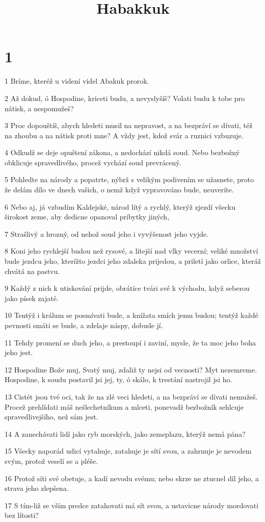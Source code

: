 

\title{Habakkuk}

\chapter{1}

\par 1 Bríme, kteréž u videní videl Abakuk prorok.
\par 2 Až dokud, ó Hospodine, kriceti budu, a nevyslyšíš? Volati budu k tobe pro nátisk, a nespomužeš?
\par 3 Proc dopouštíš, abych hledeti musil na nepravost, a na bezpráví se dívati, též na zhoubu a na nátisk proti mne? A vždy jest, kdož svár a ruznici vzbuzuje.
\par 4 Odkudž se deje opuštení zákona, a nedochází nikdá soud. Nebo bezbožný obklicuje spravedlivého, procež vychází soud prevrácený.
\par 5 Pohledte na národy a popatrte, nýbrž s velikým podivením se užasnete, proto že delám dílo ve dnech vašich, o nemž když vypravováno bude, neuveríte.
\par 6 Nebo aj, já vzbudím Kaldejské, národ lítý a rychlý, kterýž zjezdí všecku širokost zeme, aby dedicne opanoval príbytky jiných,
\par 7 Strašlivý a hrozný, od nehož soud jeho i vyvýšenost jeho vyjde.
\par 8 Koni jeho rychlejší budou než rysové, a lítejší nad vlky vecerní; veliké množství bude jezdcu jeho, kterížto jezdci jeho zdaleka prijedou, a priletí jako orlice, kteráž chvátá na pastvu.
\par 9 Každý z nich k utiskování prijde, obrátíce tvári své k východu, když seberou jako písek zajaté.
\par 10 Tentýž i králum se posmívati bude, a knížata smích jemu budou; tentýž každé pevnosti smáti se bude, a zdelaje náspy, dobude jí.
\par 11 Tehdy promení se duch jeho, a prestoupí i zaviní, mysle, že ta moc jeho boha jeho jest.
\par 12 Hospodine Bože muj, Svatý muj, zdaliž ty nejsi od vecnosti? Myt nezemreme. Hospodine, k soudu postavil jsi jej, ty, ó skálo, k trestání nastrojil jsi ho.
\par 13 Cistét jsou tvé oci, tak že na zlé veci hledeti, a na bezpráví se dívati nemužeš. Procež prehlídati máš nešlechetníkum a mlceti, ponevadž bezbožník sehlcuje spravedlivejšího, než sám jest.
\par 14 A zanechávati lidí jako ryb morských, jako zemeplazu, kterýž nemá pána?
\par 15 Všecky naporád udicí vytahuje, zatahuje je sítí svou, a zahrnuje je nevodem svým, protož veselí se a pléše.
\par 16 Protož síti své obetuje, a kadí nevodu svému; nebo skrze ne ztucnel díl jeho, a strava jeho zlepšena.
\par 17 S tím-liž se vším predce zatahovati má sít svou, a ustavicne národy mordovati bez lítosti?

